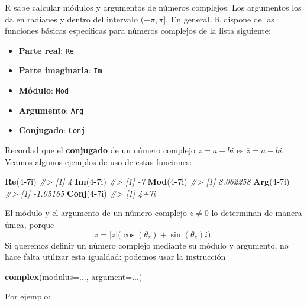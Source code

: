 \documentclass[
]{book}
\newenvironment{Shaded}{\begin{snugshade}}{\end{snugshade}}
\newcommand{\CommentTok}[1]{\textcolor[rgb]{0.56,0.35,0.01}{\textit{#1}}}
\newcommand{\DataTypeTok}[1]{\textcolor[rgb]{0.13,0.29,0.53}{#1}}
\newcommand{\DecValTok}[1]{\textcolor[rgb]{0.00,0.00,0.81}{#1}}
\newcommand{\KeywordTok}[1]{\textcolor[rgb]{0.13,0.29,0.53}{\textbf{#1}}}
\newcommand{\NormalTok}[1]{#1}
\newcommand{\OperatorTok}[1]{\textcolor[rgb]{0.81,0.36,0.00}{\textbf{#1}}}
\providecommand{\tightlist}{%
  \setlength{\itemsep}{0pt}\setlength{\parskip}{0pt}}
\theoremstyle{definition}
\theoremstyle{definition}
\theoremstyle{definition}
\theoremstyle{remark}
\begin{document}
R sabe calcular módulos y argumentos de números complejos. Los argumentos los da en radianes y dentro del intervalo \((-\pi,\pi]\).
En general, R dispone de las funciones básicas específicas para números complejos de la lista siguiente:

\begin{itemize}
\tightlist
\item
  \textbf{Parte real}: \texttt{Re}
\item
  \textbf{Parte imaginaria}: \texttt{Im}
\item
  \textbf{Módulo}: \texttt{Mod}
\item
  \textbf{Argumento}: \texttt{Arg}
\item
  \textbf{Conjugado}: \texttt{Conj}
\end{itemize}

Recordad que el \textbf{conjugado} de un número complejo \(z=a+bi\) es \(\overline{z}=a-bi\). Veamos algunos ejemplos de uso de estas funciones:

\begin{Shaded}
\begin{Highlighting}[]
\KeywordTok{Re}\NormalTok{(}\DecValTok{4}\OperatorTok{{-}}\NormalTok{7i)}
\CommentTok{\#\textgreater{} [1] 4}
\KeywordTok{Im}\NormalTok{(}\DecValTok{4}\OperatorTok{{-}}\NormalTok{7i)}
\CommentTok{\#\textgreater{} [1] {-}7}
\KeywordTok{Mod}\NormalTok{(}\DecValTok{4}\OperatorTok{{-}}\NormalTok{7i)}
\CommentTok{\#\textgreater{} [1] 8.062258}
\KeywordTok{Arg}\NormalTok{(}\DecValTok{4}\OperatorTok{{-}}\NormalTok{7i)}
\CommentTok{\#\textgreater{} [1] {-}1.05165}
\KeywordTok{Conj}\NormalTok{(}\DecValTok{4}\OperatorTok{{-}}\NormalTok{7i)}
\CommentTok{\#\textgreater{} [1] 4+7i}
\end{Highlighting}
\end{Shaded}

El módulo y el argumento de un número complejo \(z\neq 0\) lo determinan de manera única, porque
\[
z=|z|\big(\cos(\theta_z)+\sin(\theta_z)i\big).
\]
Si queremos definir un número complejo mediante su módulo y argumento, no hace falta utilizar esta igualdad: podemos usar la instrucción

\begin{Shaded}
\begin{Highlighting}[]
\KeywordTok{complex}\NormalTok{(}\DataTypeTok{modulus=}\NormalTok{..., }\DataTypeTok{argument=}\NormalTok{...)}
\end{Highlighting}
\end{Shaded}

Por ejemplo:
\end{document}
